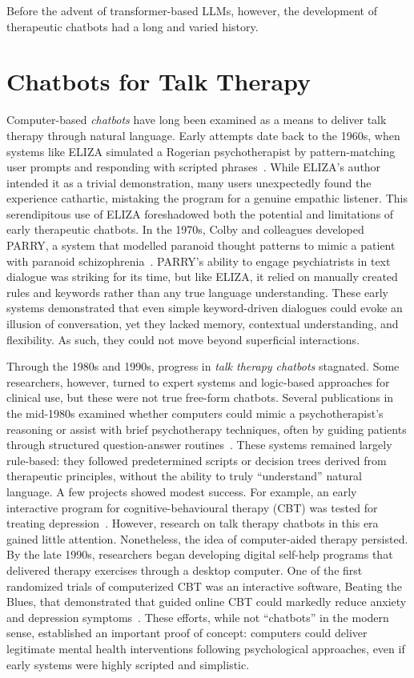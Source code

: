 Before the advent of transformer-based LLMs, however, the development of therapeutic chatbots had a long and varied history.


\section{Chatbots for Talk Therapy}
Computer-based \emph{chatbots} have long been examined as a means to deliver talk therapy through natural language. Early attempts date back to the 1960s, when systems like ELIZA simulated a Rogerian psychotherapist by pattern-matching user prompts and responding with scripted phrases~\cite{Weizenbaum1966}. While ELIZA's author intended it as a trivial demonstration, many users unexpectedly found the experience cathartic, mistaking the program for a genuine empathic listener. This serendipitous use of ELIZA foreshadowed both the potential and limitations of early therapeutic chatbots. In the 1970s, Colby and colleagues developed PARRY, a system that modelled paranoid thought patterns to mimic a patient with paranoid schizophrenia~\cite{Colby1971}. PARRY's ability to engage psychiatrists in text dialogue was striking for its time, but like ELIZA, it relied on manually created rules and keywords rather than any true language understanding. These early systems demonstrated that even simple keyword-driven dialogues could evoke an illusion of conversation, yet they lacked memory, contextual understanding, and flexibility. As such, they could not move beyond superficial interactions.


Through the 1980s and 1990s, progress in \emph{talk therapy chatbots} stagnated. Some researchers, however, turned to expert systems and logic-based approaches for clinical use, but these were not true free-form chatbots. Several publications in the mid-1980s examined whether computers could mimic a psychotherapist's reasoning or assist with brief psychotherapy techniques, often by guiding patients through structured question-answer routines~\cite{Hartman1986,Sampson1986,ServanSchreiber1986}. These systems remained largely rule-based: they followed predetermined scripts or decision trees derived from therapeutic principles, without the ability to truly ``understand'' natural language. A few projects showed modest success. For example, an early interactive program for cognitive-behavioural therapy (CBT) was tested for treating depression~\cite{Selmi1990}. However, research on talk therapy chatbots in this era gained little attention. Nonetheless, the idea of computer-aided therapy persisted. By the late 1990s, researchers began developing digital self-help programs that delivered therapy exercises through a desktop computer. One of the first randomized trials of computerized CBT was an interactive software, Beating the Blues, that demonstrated that guided online CBT could markedly reduce anxiety and depression symptoms~\cite{Proudfoot2003}. These efforts, while not ``chatbots'' in the modern sense, established an important proof of concept: computers could deliver legitimate mental health interventions following psychological approaches, even if early systems were highly scripted and simplistic.


